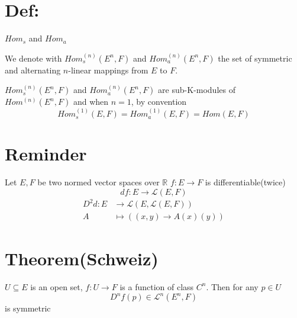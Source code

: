 \documentclass{book}
\begin{document}
\section{Def:}
$Hom_s$ and $Hom_a$

We denote with $Hom_s^{(n)}(E^n,F)$ and $Hom_a^{(n)}(E^n,F)$ the set of symmetric and alternating $n$-linear mappings from $E$ to $F$. 

$Hom^{(n)}_s(E^n,F)$ and $Hom^{(n)}_a(E^n,F)$ are sub-K-modules of $Hom^{(n)}(E^n,F)$ and when $n=1$, by convention$$Hom^{(1)}_s(E,F)=Hom^{(1)}_a(E,F)=Hom(E,F)$$

\section{Reminder}
 Let $E,F$ be two normed vector spaces over $\mathbb{R}$ $f:E\rightarrow F$ is differentiable(twice) $$df:E\rightarrow\mathscr{L}(E,F)$$
 $$
 \begin{aligned}
    D^2d:E &\rightarrow\mathscr{L}(E,\mathscr{L}(E,F))\\
    A &\mapsto ((x,y)\rightarrow A(x)(y))
 \end{aligned}$$
 \section{Theorem(Schweiz)}
 $U\subseteq E$ is an open set, $f:U\rightarrow F$ is a function of class $C^n$. Then for any $p\in U$$$D^nf(p)\in \mathscr{L}^n(E^n,F)$$ is symmetric
\end{document}
